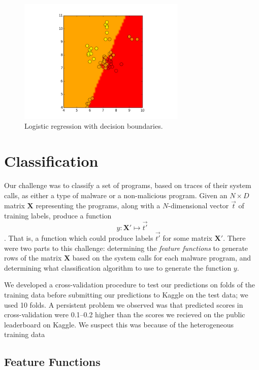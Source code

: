 \documentclass[11pt]{amsart}
\newcommand{\mat}[1]{\mathbf{#1}}
\begin{document}
\begin{figure}
  \includegraphics[width=8cm]{figure_4.png}
  \caption{Logistic regression with decision boundaries.}
\end{figure}

\section{Classification}

Our challenge was to classify a set of programs, based on traces of their system calls, as either a type of malware or a non-malicious program. Given an $N \times D$ matrix $\mat{X}$ representing the programs, along with a $N$-dimensional vector $\vec{t}$ of training labels, produce a function 
$$y : \mat{X'} \mapsto \vec{t'}$$.
That is, a function which could produce labels $\vec{t'}$ for some matrix $\mat{X'}$. There were two parts to this challenge: determining the \emph{feature functions} to generate rows of the matrix $\mat{X}$ based on the system calls for each malware program, and determining what classification algorithm to use to generate the function $y$.

We developed a cross-validation procedure to test our predictions on folds of the training data before submitting our predictions to Kaggle on the test data; we used 10 folds. A persistent problem we observed was that predicted scores in cross-validation were 0.1--0.2 higher than the scores we recieved on the public leaderboard on Kaggle. We suspect this was because of the heterogeneous training data 

\subsection{Feature Functions}
\end{document}
